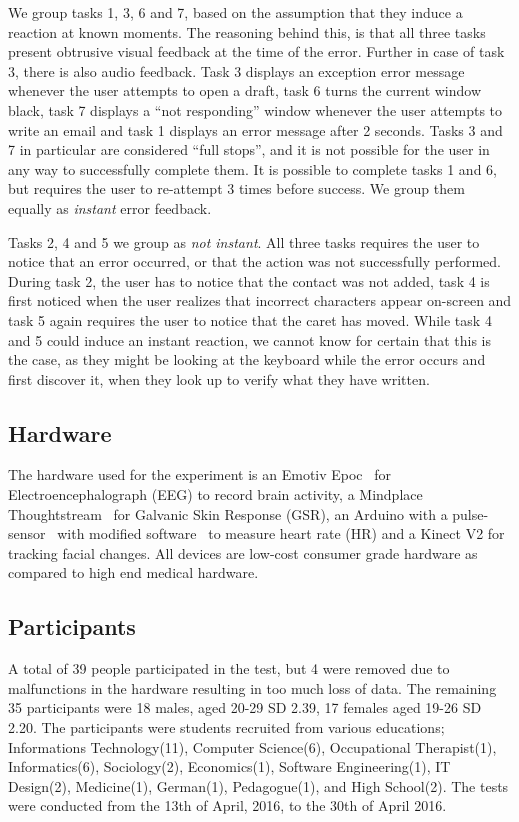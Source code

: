 We group tasks 1, 3, 6 and 7, based on the assumption that they induce a reaction at known moments. The reasoning behind this, is that all three tasks present obtrusive visual feedback at the time of the error. Further in case of task 3, there is also audio
feedback. Task 3 displays an exception error message whenever the user attempts to open a draft, task 6 turns the
current window
black, task 7 displays a ``not responding'' window whenever the user attempts to write an email and task 1 displays an
error message after 2 seconds. Tasks 3 and 7 in particular are considered ``full stops'', and it is not possible for the
user in any way to successfully complete them. It is possible to complete tasks 1 and 6, but requires the user to
re-attempt 3 times before success. We group them equally as \textit{instant} error feedback.

Tasks 2, 4 and 5 we group as \textit{not instant}. All three tasks requires the user to notice that an error occurred, or
that the action was not successfully performed. During task 2, the user has to notice that the contact was not added,
task 4 is first noticed when the user realizes that incorrect characters appear on-screen and task 5 again requires the
user to notice that the caret has moved. While task 4 and 5 could induce an instant reaction, we cannot know for
certain that this is the case, as they might be looking at the keyboard while the error occurs and first discover it, when they look up to verify what they have written.

\subsection{Hardware}
The hardware used for the experiment is an Emotiv Epoc~\cite{emotiv_epoc_website} for Electroencephalograph (EEG) to record brain activity, a Mindplace Thoughtstream~\cite{thoughtstream} for Galvanic Skin Response (GSR), an Arduino with a pulse-sensor~\cite{pulsesensor} with modified software~\cite{pulsesensorgit} to measure heart rate (HR) and a Kinect V2\cite{kinect_specs3} for tracking facial changes.
All devices are low-cost consumer grade hardware as compared to high end medical hardware.

\subsection{Participants}
A total of 39 people participated in the test, but 4 were removed due to malfunctions in the hardware resulting in too much loss of data. 
The remaining 35 participants were 18 males, aged 20-29 SD 2.39, 17 females aged 19-26 SD 2.20.
The participants were students recruited from various educations; Informations Technology(11), Computer Science(6), Occupational Therapist(1), Informatics(6), Sociology(2), Economics(1), Software Engineering(1), IT Design(2), Medicine(1), German(1), Pedagogue(1), and High School(2).
The tests were conducted from the 13th of April, 2016, to the 30th of April 2016. 


